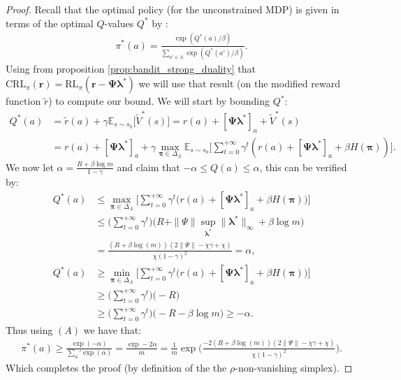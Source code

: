 \begin{proof}
    Recall that the optimal policy (for the unconstrained MDP) is given in terms of the optimal $Q$-values $Q^*$ by : 
    \begin{align*}
        \pi^*(a) = \frac{\exp(Q^*(a)/\beta)}{\sum_{a'\in A}\exp(Q^*(a')/\beta)}. \tag{A}
    \end{align*}
    Using from proposition \ref{prop:bandit_strong_duality} that $\text{CRL}_\pi(\bm{r}) = \text{RL}_\pi(\bm{r} - \bm{\Psi} \bm{\lambda}^*)$ we will use that result (on the modified reward function $\tilde{r}$) to compute our bound. We will start by bounding $Q^*$:
    \begin{align*}
        Q^*(a) &= \tilde{r}(a) + \gamma \mathbb{E}_{s \sim s_0} \Big[ \tilde{V}^*(s) \Big] 
        = r(a) + [\bm{\Psi} \bm{\lambda}^*]_a + \tilde{V}^*(s) \\
        & =  r(a) + [\bm{\Psi} \bm{\lambda}^*]_a  + \gamma  \max_{\bm{\pi}\in \Delta_A} \mathbb{E}_{s \sim s_0} \Big[ \sum_{t=0}^{+\infty} \gamma^t ( r(a) + [\bm{\Psi} \bm{\lambda}^*]_a +\beta H(\bm{\pi})) \Big].
    \end{align*}
    We now let $\alpha = \frac{R + \beta \log m}{1-\gamma}$ and claim that $-\alpha \leq Q(a) \leq \alpha$, this can be verified by:
    \begin{align*}
        Q^*(a) &\leq \max_{\bm{\pi}\in \Delta_A} \Bigg[ \sum_{t=0}^{+\infty} \gamma^t \bigl( r(a)+ [\bm{\Psi} \bm{\lambda}^*]_a + \beta H(\bm{\pi}) \bigr) \Bigg]\\
        &\leq  \Big( \sum_{t=0}^{+\infty} \gamma^t \Big) \Big( R + \| \Psi \| \sup_{\bm{\lambda}^*} \|\bm{\lambda}^*\|_\infty + \beta \log m \Big)\\
        &= \frac{\left(R + \beta \log{\left(m \right)}\right) \left(2  \|\Psi\| - \chi \gamma + \chi\right)}{\chi \left(1- \gamma\right)^{2}}
        = \alpha,\\
        Q^*(a) &\geq \min_{\bm{\pi}\in \Delta_A} \Bigg[ \sum_{t=0}^{+\infty} \gamma^t \bigl( r(a) + [\bm{\Psi} \bm{\lambda}^*]_a  + \beta H(\bm{\pi}) \bigr) \Bigg]\\
        &\geq  \Big( \sum_{t=0}^{+\infty} \gamma^t \Big) \Big( -R \Big)
        \\ &\geq  \Big( \sum_{t=0}^{+\infty} \gamma^t \Big) \Big( -R - \beta \log m \Big) \geq -\alpha.
    \end{align*}
    Thus using $(A)$ we have that:
    \begin{align*}
        \pi^*(a) \geq \frac{\exp(-\alpha)}{\sum_a' \exp(\alpha)} 
        = \frac{\exp -2 \alpha}{m} 
        = \frac{1}{m} \exp \Bigg(\frac{-2\left(R + \beta \log{\left(m \right)}\right) \left(2  \|\Psi\| - \chi \gamma + \chi\right)}{\chi \left(1- \gamma\right)^{2}} \Bigg).
    \end{align*}
    Which completes the proof (by definition of the the $\rho$-non-vanishing simplex).
\end{proof}


